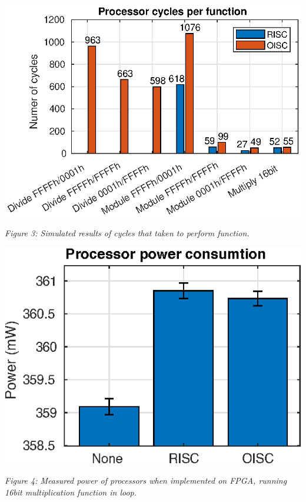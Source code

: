 \documentclass[portrait,color=UCLmidgreen,margin=1.5cm,bannerheight=8cm,logoheight=3.5cm]{uclposter}
\begin{document}
\begin{tcolorbox}[title=Results]
\begin{multicols}{3}
		\columnbreak
		\includegraphics[width=\linewidth]{../tests/cycles.eps}
		\begin{center}
			\textit{Figure 3: Simulated results of cycles that taken to perform function. }
		\end{center}
	
		\columnbreak
		\includegraphics[width=\linewidth]{../tests/power.eps}
		\begin{center}
			\textit{Figure 4: Measured power of processors when implemented on FPGA, running 16bit multiplication function in loop.}
		\end{center}

	\end{multicols}
	

\end{tcolorbox}
\end{document}
